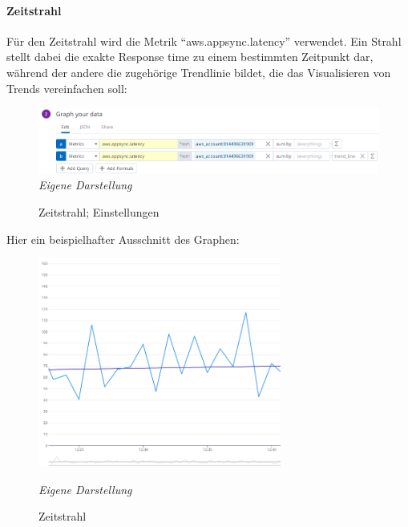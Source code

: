 \paragraph{Zeitstrahl}
Für den Zeitstrahl wird die Metrik ``aws.appsync.latency'' verwendet. Ein Strahl stellt dabei die exakte Response time zu einem bestimmten Zeitpunkt dar, während der andere die zugehörige Trendlinie bildet, die das Visualisieren von Trends vereinfachen soll:\newline

	\begin{figure}[H]
	\centering
	\begin{minipage}[t]{.7\textwidth} %
	\caption{Zeitstrahl; Einstellungen} %
	
	\includegraphics[width = 15cm,keepaspectratio]{graphOneSettings}\newline
	\textit{Eigene Darstellung} %
	\label{fig:zeitStrahlEinstellungen}
	\end{minipage}
	\end{figure}
	
	Hier ein beispielhafter Ausschnitt des Graphen:
	
	\begin{figure}[H]
	\centering
	\begin{minipage}[t]{.7\textwidth} %
	\caption{Zeitstrahl} %
	
	\includegraphics[width = 8cm,keepaspectratio]{graphOneItself} \newline
	
	\textit{Eigene Darstellung} %
	\label{fig:zeitstrahl}
	\end{minipage}
	\end{figure}
 
